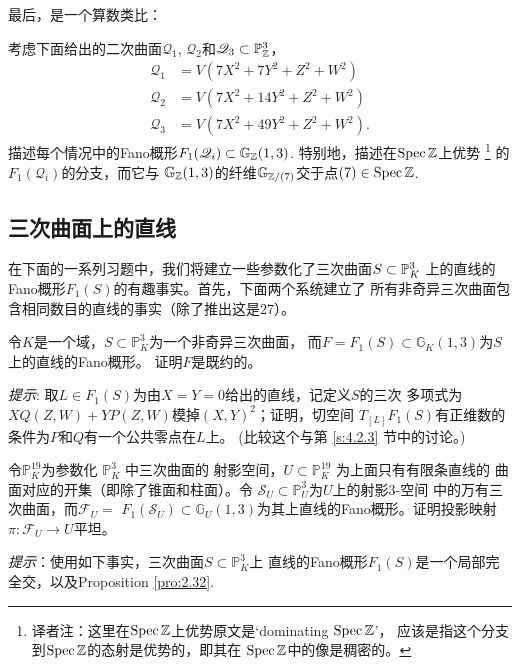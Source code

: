最后，是一个算数类比：

\begin{exe}\label{exe:4.72}
考虑下面给出的二次曲面$\mathscr Q_1$, $\mathscr Q_2$和$\mathscr Q_3\subset \P_\zz^3$，
\[
\begin{aligned} \mathscr{Q}_{1} &=V\left(7 X^{2}+7 Y^{2}+Z^{2}+W^{2}\right) \\ \mathscr{Q}_{2} &=V\left(7 X^{2}+14 Y^{2}+Z^{2}+W^{2}\right) \\ \mathscr{Q}_{3} &=V\left(7 X^{2}+49 Y^{2}+Z^{2}+W^{2}\right).\end{aligned}
\]
描述每个情况中的Fano概形$F_1(\mathscr Q_i)\subset \mathbb G_\zz(1,3)$.
特别地，描述在$\spec \zz$上优势%
\footnote{
	译者注：这里在$\spec \zz$上优势原文是`dominating $\spec \zz$'，
	应该是指这个分支到$\spec \zz$的态射是优势的，即其在
	$\spec \zz$中的像是稠密的。
}%
的$F_1(\mathscr Q_i)$的分支，而它与
$\mathbb G_\zz(1,3)$的纤维$\mathbb G_{\zz/(7)}$交于点$(7)\in \spec \zz$.
\end{exe}

\subsection{三次曲面上的直线}

在下面的一系列习题中，我们将建立一些参数化了三次曲面$S\subset \P_K^3$
上的直线的Fano概形$F_1(S)$的有趣事实。首先，下面两个系统建立了
所有非奇异三次曲面包含相同数目的直线的事实（除了推出这是$27$）。


\begin{exe}\label{exe:4.73}
令$K$是一个域，$S \subset \mathbb{P}_{K}^{3}$为一个非奇异三次曲面，
而$F=F_{1}(S) \subset \mathbb{G}_{K}(1,3)$为$S$上的直线的Fano概形。 
证明$F$是既约的。

\emph{提示}: 取$L \in F_{1}(S)$为由$X=Y=0$给出的直线，记定义$S$的三次
多项式为$X Q(Z, W)+Y P(Z, W)$模掉$(X, Y)^{2}$；证明，切空间
$T_{[L]} F_{1}(S)$有正维数的条件为$P$和$Q$有一个公共零点在$L$上。
(比较这个与第 \ref{s:4.2.3} 节中的讨论。)
\end{exe}

\begin{exe}\label{exe:4.74}
令$\mathbb{P}_{K}^{19}$为参数化 $\mathbb{P}_{K}^{3}$ 中三次曲面的
射影空间，$U \subset \mathbb{P}_{K}^{19}$ 为上面只有有限条直线的
曲面对应的开集（即除了锥面和柱面）。令
$\mathscr{S}_{U} \subset \mathbb{P}_{U}^{3}$为$U$上的射影$3$-空间
中的万有三次曲面，而$\mathscr{F}_{U}=$ $F_{1}\left(\mathscr{S}_{U}\right) \subset \mathbb{G}_{U}(1,3)$为其上直线的Fano概形。证明投影映射
$\pi: \mathscr{F}_{U} \rightarrow U$平坦。

\emph{提示}：使用如下事实，三次曲面$S \subset \mathbb{P}_{K}^{3}$上
直线的Fano概形$F_{1}(S)$是一个局部完全交，以及Proposition \ref{pro:2.32}.
\end{exe}

